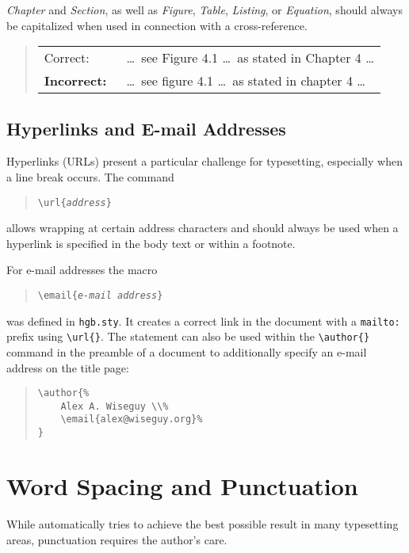 \emph{Chapter} and \emph{Section}, as well as \emph{Figure}, \emph{Table},
\emph{Listing}, or \emph{Equation}, should always be capitalized when used in
connection with a cross-reference.
%
\begin{quote}
	\begin{tabular}{ll}
		\textrm{Correct:\ } & \ldots\ see Figure 4.1 \ldots\ as stated in
		Chapter 4 \ldots \\
		\textbf{Incorrect:\ }  & \ldots\ see figure 4.1 \ldots\ as stated in
		chapter 4 \ldots
	\end{tabular}
\end{quote}

\subsection{Hyperlinks and E-mail Addresses}

Hyperlinks (URLs) present a particular challenge for typesetting, especially
when a line break occurs. The command
%
\begin{quote}
    \verb!\url{!\texttt{\em address}\verb!}!
\end{quote}
%
allows wrapping at certain address characters and should always be used when a
hyperlink is specified in the body text or within a footnote.

For e-mail addresses the macro
%
\begin{quote}
    \verb!\email{!\texttt{\em e-mail address}\verb!}!
\end{quote}
%
was defined in \texttt{hgb.sty}. It creates a correct link in the document with
a \texttt{mailto:} prefix using \verb|\url{}|. The statement can also be used
within the \verb|\author{}| command in the preamble of a document to
additionally specify an e-mail address on the title page:
%
\begin{quote}
    \begin{verbatim}
\author{%
    Alex A. Wiseguy \\%
    \email{alex@wiseguy.org}%
}
    \end{verbatim}
\end{quote}
%


\section{Word Spacing and Punctuation}

While \latex automatically tries to achieve the best possible result in many
typesetting areas, punctuation requires the author's care.

